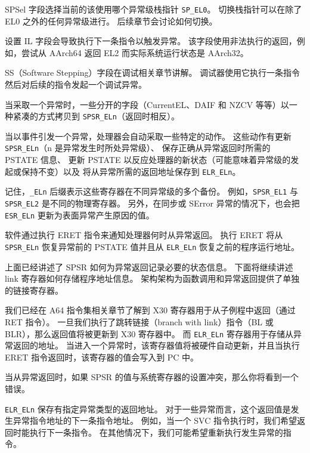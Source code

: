 SPSel 字段选择当前的该使用哪个异常级栈指针 \lstinline!SP_EL0!。
切换栈指针可以在除了 EL0 之外的任何异常级进行。
后续章节会讨论如何切换。

设置 IL 字段会导致执行下一条指令以触发异常。
该字段使用非法执行的返回，例如，尝试从 AArch64 返回 EL2 而实际系统运行状态是 AArch32。

SS（Software Stepping）字段在调试相关章节讲解。
调试器使用它执行一条指令然后对后续的指令发起一个调试异常。

当采取一个异常时，一些分开的字段（CurrentEL、DAIF 和 NZCV 等等）以一种紧凑的方式拷贝到 \lstinline!SPSR_ELn!（返回时相反）。

当以事件引发一个异常，处理器会自动采取一些特定的动作。
这些动作有更新 \lstinline!SPSR_ELn!（n 是异常发生时所处异常级）、
保存正确从异常返回时所需的 PSTATE 信息、
更新 PSTATE 以反应处理器的新状态（可能意味着异常级的发起或保持不变）以及
将从异常所需的返回地址保存到 \lstinline!ELR_ELn!。


记住，\lstinline!_ELn! 后缀表示这些寄存器在不同异常级的多个备份。
例如，\lstinline!SPSR_EL1! 与 \lstinline!SPSR_EL2! 是不同的物理寄存器。
另外，在同步或 SError 异常的情况下，也会把 \lstinline!ESR_ELn! 更新为表面异常产生原因的值。

软件通过执行 ERET 指令来通知处理器何时从异常返回。
执行 ERET 将从 \lstinline!SPSR_ELn! 恢复异常前的 PSTATE 值并且从 \lstinline!ELR_ELn! 恢复之前的程序运行地址。

上面已经讲述了 SPSR 如何为异常返回记录必要的状态信息。
下面将继续讲述 link 寄存器如何存储程序地址信息。
架构架构为函数调用和异常返回提供了单独的链接寄存器。

我们已经在 A64 指令集相关章节了解到 X30 寄存器用于从子例程中返回（通过 RET 指令）。
一旦我们执行了跳转链接（branch with link）指令（BL 或 BLR），那么返回值将被更新到 X30 寄存器中。
而 \lstinline!ELR_ELn! 寄存器用于存储从异常返回的地址。
当进入一个异常时，该寄存器值将被硬件自动更新，并且当执行 ERET 指令返回时，该寄存器的值会写入到 PC 中。

\begin{Tcbox}[title={Note}]
  当从异常返回时，如果 SPSR 的值与系统寄存器的设置冲突，那么你将看到一个错误。
\end{Tcbox}

\lstinline!ELR_ELn! 保存有指定异常类型的返回地址。
对于一些异常而言，这个返回值是发生异常指令地址的下一条指令地址。
例如，当一个 SVC 指令执行时，我们希望返回时能执行下一条指令。
在其他情况下，我们可能希望重新执行发生异常的指令。

